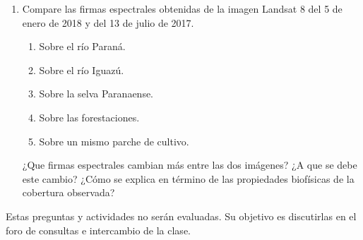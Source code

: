 \begin{enumerate}
  \item Compare las firmas espectrales obtenidas de la imagen Landsat 8 del 5 de enero de 2018 y del 13 de julio de 2017.
  \begin{enumerate}
    \item Sobre el río Paraná.
    \item Sobre el río Iguazú.
    \item Sobre la selva Paranaense.
    \item Sobre las forestaciones.
    \item Sobre un mismo parche de cultivo.
  \end{enumerate}
  ¿Que firmas espectrales cambian más entre las dos imágenes? ¿A que se debe este cambio? ¿Cómo se explica en término de las propiedades biofísicas de la cobertura observada?
\end{enumerate}

Estas preguntas y actividades no serán evaluadas. Su objetivo es discutirlas en el foro de consultas e intercambio de la clase.
